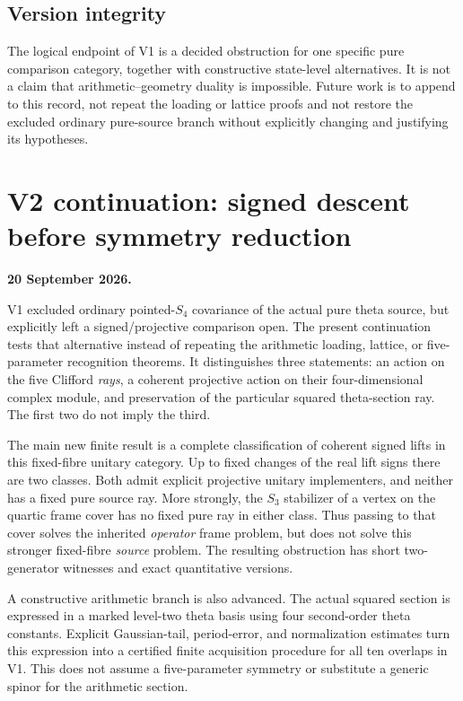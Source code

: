 \documentclass[11pt]{article}
\theoremstyle{definition}
\theoremstyle{remark}
\begin{document}
\subsection{Version integrity}
The logical endpoint of V1 is a decided obstruction for one specific pure
comparison category, together with constructive state-level alternatives.
It is not a claim that arithmetic--geometry duality is impossible. Future
work is to append to this record, not repeat the loading or lattice proofs
and not restore the excluded ordinary pure-source branch without explicitly
changing and justifying its hypotheses.


\clearpage
\section{V2 continuation: signed descent before symmetry reduction}
\label{sec:v2-context}
\noindent\textbf{20 September 2026.}

V1 excluded ordinary pointed-$S_4$ covariance of the actual pure theta
source, but explicitly left a signed/projective comparison open. The present
continuation tests that alternative instead of repeating the arithmetic
loading, lattice, or five-parameter recognition theorems. It distinguishes
three statements: an action on the five Clifford \emph{rays}, a coherent
projective action on their four-dimensional complex module, and preservation
of the particular squared theta-section ray. The first two do not imply the
third.

The main new finite result is a complete classification of coherent signed
lifts in this fixed-fibre unitary category. Up to fixed changes of the real
lift signs there are two classes. Both admit explicit projective unitary
implementers, and neither has a fixed pure source ray. More strongly, the
$S_3$ stabilizer of a vertex on the quartic frame cover has no fixed pure ray
in either class. Thus passing to that cover solves the inherited
\emph{operator} frame problem, but does not solve this stronger fixed-fibre
\emph{source} problem. The resulting obstruction has short two-generator
witnesses and exact quantitative versions.

A constructive arithmetic branch is also advanced. The actual squared
section is expressed in a marked level-two theta basis using four
second-order theta constants. Explicit Gaussian-tail, period-error, and
normalization estimates turn this expression into a certified finite
acquisition procedure for all ten overlaps in V1. This does not assume a
five-parameter symmetry or substitute a generic spinor for the arithmetic
section.
\end{document}
